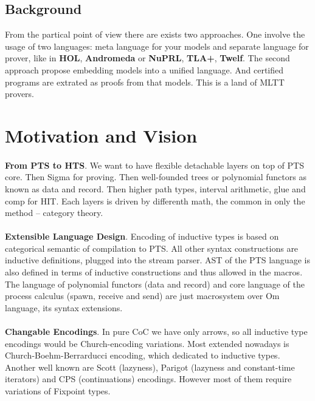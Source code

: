 \documentclass[11pt,oneside]{article}
\begin{document}
\subsection{Background}
From the partical point of view there are exists two approaches.
One involve the usage of two languages: meta language for your models
and separate language for prover, like in {\bf HOL}, {\bf Andromeda} or {\bf NuPRL}, {\bf TLA+}, {\bf Twelf}.
The second approach propose embedding models into a unified language.
And certified programs are extrated as proofs from that models. This is a land of MLTT provers.

\newpage
\section{Motivation and Vision}

\paragraph{}
{\bf From PTS to HTS}. We want to have flexible detachable
layers on top of PTS core. Then Sigma for proving.
Then well-founded trees or polynomial functors as known as data and record.
Then higher path types, interval arithmetic, glue and comp for HIT.
Each layers is driven by differenth math, the common in only the method -- category theory.

\paragraph{}
{\bf Extensible Language Design}. Encoding of inductive types is based on categorical
semantic of compilation to PTS. All other syntax constructions are inductive
definitions, plugged into the stream parser. AST of the PTS language is also
defined in terms of inductive constructions and thus allowed in the macros.
The language of polynomial functors (data and record) and core language of
the process calculus (spawn, receive and send) are just macrosystem over Om language,
its syntax extensions.

\paragraph{}
{\bf Changable Encodings}. In pure CoC we have only arrows, so all inductive type encodings would
be Church-encoding variations. Most extended nowadays is Church-Boehm-Berrarducci encoding,
which dedicated to inductive types. Another well known are Scott (lazyness),
Parigot (lazyness and constant-time iterators) and CPS (continuations) encodings.
However most of them require variations of Fixpoint types.
\end{document}
